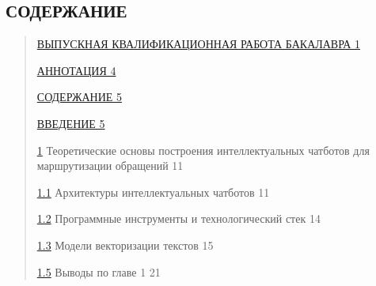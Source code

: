 \hypertarget{ux441ux43eux434ux435ux440ux436ux430ux43dux438ux435}{%
\subsection*{СОДЕРЖАНИЕ}\label{ux441ux43eux434ux435ux440ux436ux430ux43dux438ux435}}

\begin{quote}
\protect\hyperlink{ux432ux44bux43fux443ux441ux43aux43dux430ux44f-ux43aux432ux430ux43bux438ux444ux438ux43aux430ux446ux438ux43eux43dux43dux430ux44f-ux440ux430ux431ux43eux442ux430-ux431ux430ux43aux430ux43bux430ux432ux440ux430}{ВЫПУСКНАЯ
КВАЛИФИКАЦИОННАЯ РАБОТА БАКАЛАВРА 1}

\protect\hyperlink{ux430ux43dux43dux43eux442ux430ux446ux438ux44f}{АННОТАЦИЯ
4}

\protect\hyperlink{ux441ux43eux434ux435ux440ux436ux430ux43dux438ux435}{СОДЕРЖАНИЕ
5}

\protect\hyperlink{ux432ux432ux435ux434ux435ux43dux438ux435}{ВВЕДЕНИЕ 5}

\protect\hyperlink{ux442ux435ux43eux440ux435ux442ux438ux447ux435ux441ux43aux438ux435-ux43eux441ux43dux43eux432ux44b-ux43fux43eux441ux442ux440ux43eux435ux43dux438ux44f-ux438ux43dux442ux435ux43bux43bux435ux43aux442ux443ux430ux43bux44cux43dux44bux445-ux447ux430ux442ux431ux43eux442ux43eux432-ux434ux43bux44f-ux43cux430ux440ux448ux440ux443ux442ux438ux437ux430ux446ux438ux438-ux43eux431ux440ux430ux449ux435ux43dux438ux439}{1}
Теоретические основы построения интеллектуальных чатботов для
маршрутизации обращений 11

\protect\hyperlink{ux430ux440ux445ux438ux442ux435ux43aux442ux443ux440ux44b-ux438ux43dux442ux435ux43bux43bux435ux43aux442ux443ux430ux43bux44cux43dux44bux445-ux447ux430ux442ux431ux43eux442ux43eux432}{1.1}
Архитектуры интеллектуальных чатботов 11

\protect\hyperlink{ux43fux440ux43eux433ux440ux430ux43cux43cux43dux44bux435-ux438ux43dux441ux442ux440ux443ux43cux435ux43dux442ux44b-ux438-ux442ux435ux445ux43dux43eux43bux43eux433ux438ux447ux435ux441ux43aux438ux439-ux441ux442ux435ux43a}{1.2}
Программные инструменты и технологический стек 14

\protect\hyperlink{ux43cux43eux434ux435ux43bux438-ux432ux435ux43aux442ux43eux440ux438ux437ux430ux446ux438ux438-ux442ux435ux43aux441ux442ux43eux432}{1.3}
Модели векторизации текстов 15

\protect\hyperlink{ux432ux44bux432ux43eux434ux44b-ux43fux43e-ux433ux43bux430ux432ux435-1}{1.5}
Выводы по главе 1 21


\end{quote}

